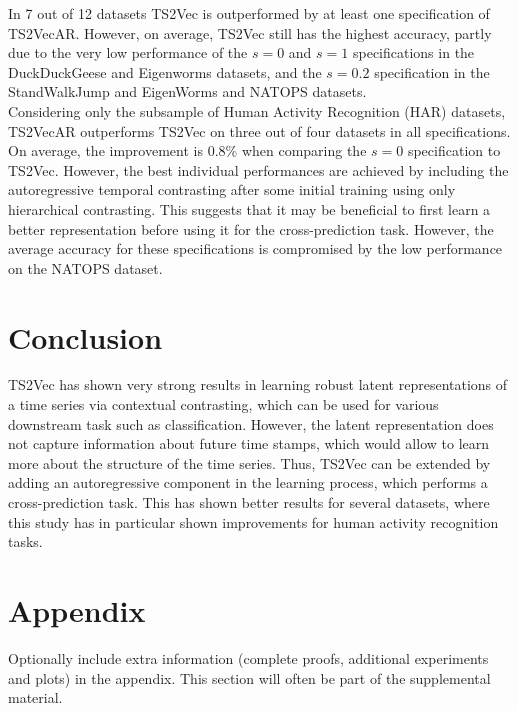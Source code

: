 \documentclass{article}
\begin{document}
In 7 out of 12 datasets TS2Vec is outperformed by at least one specification of TS2VecAR. However, on average, TS2Vec still has the highest accuracy, partly due to the very low performance of the  $s=0$ and $s=1$ specifications in the DuckDuckGeese and Eigenworms datasets, and the $s=0.2$ specification in the StandWalkJump and EigenWorms and NATOPS datasets. \\

Considering only the subsample of Human Activity Recognition (HAR) datasets, TS2VecAR outperforms TS2Vec on three out of four datasets in all specifications.  On average, the improvement is $0.8\%$ when comparing the $s=0$ specification to TS2Vec. However, the best individual performances are achieved by including the autoregressive temporal contrasting after some initial training using only hierarchical contrasting. This suggests that it may be beneficial to first learn a better representation before using it for the cross-prediction task. However, the average accuracy for these specifications is compromised by the low performance on the NATOPS dataset.

\section{Conclusion}

TS2Vec has shown very strong results in learning robust latent representations of a time series via contextual contrasting, which can be used for various downstream task such as classification. However, the latent representation does not capture information about future time stamps, which would allow to learn more about the structure of the time series. Thus, TS2Vec can be extended by adding an autoregressive component in the learning process, which performs a cross-prediction task. This has shown better results for several datasets, where this study has in particular shown improvements for human activity recognition tasks.

\newpage







\appendix


\section{Appendix}


Optionally include extra information (complete proofs, additional experiments and plots) in the appendix.
This section will often be part of the supplemental material.
\end{document}
